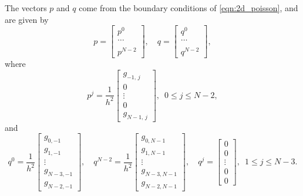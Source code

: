 
The vectors $p$ and $q$ come from the boundary conditions of \eqref{eqn:2d_poisson}, and are given by 
\[p = \begin{bmatrix} p^0 \\ \ldots \\ \\ p^{N-2} \end{bmatrix}, \quad  q = \begin{bmatrix} q^0 \\ \ldots \\ \\ q^{N-2} \end{bmatrix},\]
where 
\[p^j = \frac{1}{h^2} \begin{bmatrix} g_{-1,\,j} \\ 0 \\ \vdots \\0\\ g_{N-1,\,j} \end{bmatrix} ,\,\,\, 0 \leq j \leq N-2,\]
and 
\[q^0 = \frac{1}{h^2}\begin{bmatrix} g_{0,-1}  \\ g_{1,-1} \\ \vdots \\ g_{N-3,-1}\\ g_{N-2,-1} \end{bmatrix}, \quad q^{N-2} = \frac{1}{h^2}\begin{bmatrix} g_{0,N-1} \\ g_{1,N-1} \\ \vdots \\ g_{N-3,N-1}\\ g_{N-2,N-1} \end{bmatrix}, \quad q^{j} = \begin{bmatrix} 0 \\ 0 \\ \vdots \\ 0 \\ 0 \end{bmatrix} ,\,\,\, 1 \leq j \leq N-3.\]

